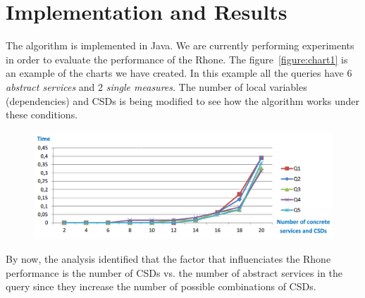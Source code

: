 \section{Implementation and Results}
The algorithm is implemented in Java. 
We are currently performing experiments in order to evaluate the performance of the Rhone. 
The figure~\ref{figure:chart1} is an example of the charts we have created.
In this example all the queries have 6 \textit{abstract services} and 2 \textit{single measures}. The number of local variables (dependencies) and CSDs is being modified to see how the algorithm works under these conditions.
\begin{center}
\begin{figure}[h!]
\includegraphics[scale=0.3]{chart1.PNG} 
\end{figure}\label{figure:chart1}
\end{center}

By now, the analysis identified that the factor that influenciates the Rhone performance is the number of CSDs vs. the number of abstract services in the query since they increase the number of possible combinations of CSDs.